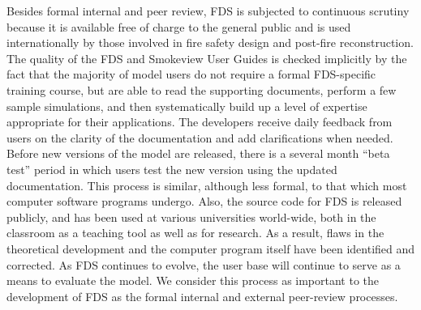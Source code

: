 \documentclass[11pt]{book}
\begin{document}
Besides formal internal and peer review, FDS is subjected to continuous scrutiny because it is available free of charge to the general public and is used internationally by those involved in fire safety design and post-fire reconstruction. The quality of the FDS and Smokeview User Guides is checked implicitly by the fact that the majority of model users do not require a formal FDS-specific training course, but are able to read the supporting documents, perform a few sample simulations, and then systematically build up a level of expertise appropriate for their applications. The developers receive daily feedback from users on the clarity of the documentation and add clarifications when needed. Before new versions of the model are released, there is a several month ``beta test'' period in which users test the new version using the updated documentation. This process is similar, although less formal, to that which most computer software programs undergo. Also, the source code for FDS is released publicly, and has been used at various universities world-wide, both in the classroom as a teaching tool as well as for research. As a result, flaws in the theoretical development and the computer program itself have been identified and corrected. As FDS continues to evolve, the user base will continue to serve as a means to evaluate the model. We consider this process as important to the development of FDS as the formal internal and external peer-review processes.









\backmatter
\nopart



\printindex
\end{document}
